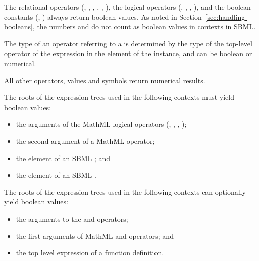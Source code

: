The relational operators (, , ,
, , ), the logical operators
(, , , ), and the
boolean constants (, ) always return
boolean values.  As noted in
  Section~\ref{sec:handling-booleans}, the numbers  and
   do not count as boolean values in \mathml
  contexts in SBML.

The type of an operator referring to a \FunctionDefinition is
determined by the type of the top-level operator of the expression
in the  element of the \FunctionDefinition
instance, and can be boolean or numerical.

All other operators, values and symbols return numerical
results.

The roots of the expression trees used in the following contexts
must yield boolean values:

\begin{itemize}\setlength{\parskip}{-0.2ex}

\item the arguments of the MathML logical operators (,
, , );

\item the second argument of a MathML  operator;

\item the  element of an SBML \Event; and

\item the  element of an SBML \Constraint.

\end{itemize}

The roots of the expression trees used in the following contexts can
optionally yield boolean values:

\begin{itemize}\setlength{\parskip}{-0.2ex}

\item the arguments to the  and  operators;

\item the first arguments of MathML  and 
operators; and

\item the top level expression of a function definition.

\end{itemize}


